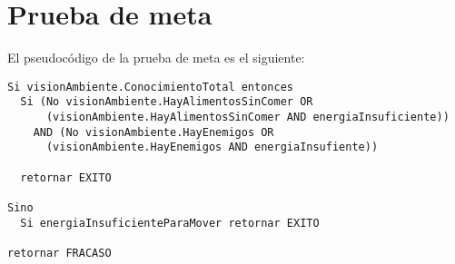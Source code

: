 \section{Prueba de meta}

El pseudocódigo de la prueba de meta es el siguiente:

\begin{verbatim}
Si visionAmbiente.ConocimientoTotal entonces
  Si (No visionAmbiente.HayAlimentosSinComer OR
      (visionAmbiente.HayAlimentosSinComer AND energiaInsuficiente))
    AND (No visionAmbiente.HayEnemigos OR
      (visionAmbiente.HayEnemigos AND energiaInsufiente))

  retornar EXITO

Sino
  Si energiaInsuficienteParaMover retornar EXITO

retornar FRACASO
\end{verbatim}
